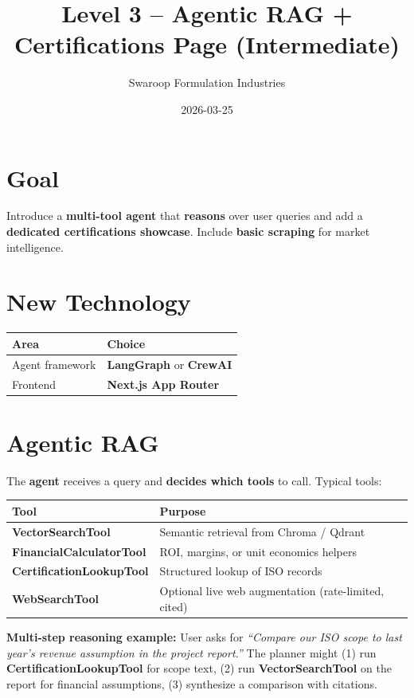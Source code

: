\documentclass{article}
\title{Level 3 -- Agentic RAG + Certifications Page (Intermediate)}
\author{Swaroop Formulation Industries}
\date{2026-03-25}
\begin{document}
\maketitle

\section{Goal}

Introduce a \textbf{multi-tool agent} that \textbf{reasons} over user queries and add a \textbf{dedicated certifications showcase}. Include \textbf{basic scraping} for market intelligence.

\section{New Technology}

\begin{tabular}{@{}ll@{}}
\toprule
\textbf{Area} & \textbf{Choice} \\
\midrule
Agent framework & \textbf{LangGraph} or \textbf{CrewAI} \\
Frontend & \textbf{Next.js App Router} \\
\bottomrule
\end{tabular}

\section{Agentic RAG}

The \textbf{agent} receives a query and \textbf{decides which tools} to call. Typical tools:

\begin{tabular}{@{}lp{7.5cm}@{}}
\toprule
\textbf{Tool} & \textbf{Purpose} \\
\midrule
\textbf{VectorSearchTool} & Semantic retrieval from Chroma / Qdrant \\
\textbf{FinancialCalculatorTool} & ROI, margins, or unit economics helpers \\
\textbf{CertificationLookupTool} & Structured lookup of ISO records \\
\textbf{WebSearchTool} & Optional live web augmentation (rate-limited, cited) \\
\bottomrule
\end{tabular}

\textbf{Multi-step reasoning example:} User asks for \textit{``Compare our ISO scope to last year's revenue assumption in the project report.''} The planner might (1) run \textbf{CertificationLookupTool} for scope text, (2) run \textbf{VectorSearchTool} on the report for financial assumptions, (3) synthesize a comparison with citations.
\end{document}

